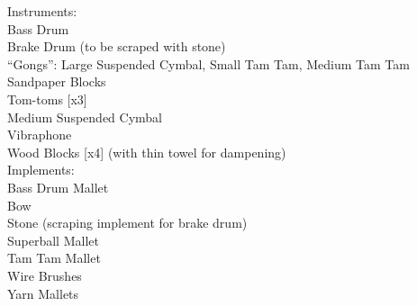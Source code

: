 \documentclass[11pt]{article}
\begin{document}
\hspace*{1cm} Instruments:
\\
\hspace*{2cm} Bass Drum
\\
\hspace*{2cm} Brake Drum (to be scraped with stone)
\\
\hspace*{2cm} ``Gongs'': Large Suspended Cymbal, Small Tam Tam, Medium Tam Tam
\\
\hspace*{2cm} Sandpaper Blocks
\\
\hspace*{2cm} Tom-toms [x3]
\\
\hspace*{2cm} Medium Suspended Cymbal
\\
\hspace*{2cm} Vibraphone
\\
\hspace*{2cm} Wood Blocks [x4] (with thin towel for dampening)
\\
\hspace*{1cm} Implements:
\\
\hspace*{2cm} Bass Drum Mallet
\\
\hspace*{2cm} Bow
\\
\hspace*{2cm} Stone (scraping implement for brake drum)
\\
\hspace*{2cm} Superball Mallet
\\
\hspace*{2cm} Tam Tam Mallet
\\
\hspace*{2cm} Wire Brushes
\\
\hspace*{2cm} Yarn Mallets
\end{document}
